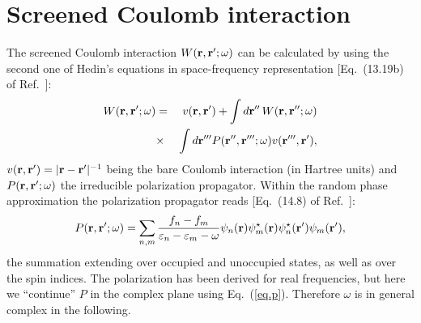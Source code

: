 \documentclass[twocolumn,prb,showpacs,superscriptaddress]{revtex4}
\def\w{\omega}
\def\E{\varepsilon}
\def\r{{\bf r}}
\def\rp{{\bf r^\prime}}
\def\rpp{{\bf r^{\prime\prime}}}
\def\rppp{{\bf r^{\prime\prime\prime}}}
\begin{document}
\section{Screened Coulomb interaction}

The screened Coulomb interaction $W(\r,\rp;\w)$ can be calculated by using
the second one of Hedin's equations in space-frequency representation
[Eq.\ (13.19b) of Ref.~]:
  \begin{eqnarray}\label{eq.w}
  W(\r,\rp;\w) & = & v(\r,\rp) + \int d\rpp \,W(\r,\rpp;\w)  \nonumber \\
   & \times & \int d\rppp P(\rpp,\rppp;\w) v(\rppp,\rp), 
  \end{eqnarray}
$v(\r,\rp)=|\r-\rp|^{-1}$ being the bare Coulomb interaction (in Hartree units) and
$P(\r,\rp;\w)$ the irreducible polarization propagator. 
Within the random phase approximation the polarization propagator reads 
[Eq.\ (14.8) of Ref.~]:
  \begin{equation}\label{eq.p}
  P(\r,\rp;\w) = \sum_{n,m} \frac{f_n-f_m}{\E_n-\E_m-\w} 
  \psi_n(\r)\psi_m^\star(\r)  \psi_n^\star(\rp)\psi_m(\rp),
  \end{equation}
the summation extending over occupied and unoccupied states, as well as
over the spin indices.\cite{note.w.even}
The polarization has been derived for real frequencies, but here we ``continue''
$P$ in the complex plane using Eq.\ (\ref{eq.p}). Therefore $\w$ is in general complex
in the following.
\end{document}
